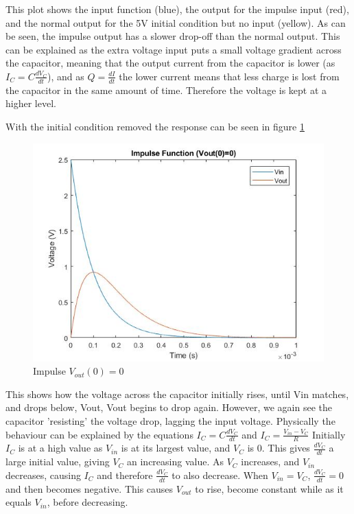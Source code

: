 \documentclass[11pt, oneside, titlepage]{article}   	%
\begin{document}
This plot shows the input function (blue), the output for the impulse input (red), and the normal output for the 5V initial condition but no input (yellow). As can be seen, the impulse output has a slower drop-off than the normal output. This can be explained as the extra voltage input puts a small voltage gradient across the capacitor, meaning that the output current from the capacitor is lower (as $I_C=C\frac{dV_C}{dt}$), and as $Q=\frac{dI}{dt}$ the lower current means that less charge is lost from the capacitor in the same amount of time. Therefore the voltage is kept at a higher level. 

With the initial condition removed the response can be seen in figure \ref{fig:ex1_7}

\begin{figure}[H]
\center
\includegraphics[scale = 0.5]{exercise1_7}
\caption{Impulse $V_{out}(0) = 0$} \label{fig:ex1_7}
\end{figure}

This shows how the voltage across the capacitor initially rises, until Vin matches, and drops below, Vout, Vout begins to drop again. However, we again see the capacitor 'resisting' the voltage drop, lagging the input voltage. Physically the behaviour can be explained by the equations $I_C=C\frac{dV_C}{dt}$ and $ I_C=\frac{V_{in}-V_C}{R}$ Initially $I_C$ is at a high value as $V_{in}$ is at its largest value, and $V_C$ is 0. This gives  $\frac{dV_C}{dt}$ a large initial value, giving $V_C$ an increasing value. As $V_C$ increases, and $V_{in}$ decreases, causing $I_C$ and therefore $\frac{dV_C}{dt}$ to also decrease. When $V_{in}=V_C$, $\frac{dV_C}{dt}=0$ and then becomes negative. This causes $V_{out}$ to rise, become constant while as it equals $V_{in}$, before decreasing.
\end{document}
